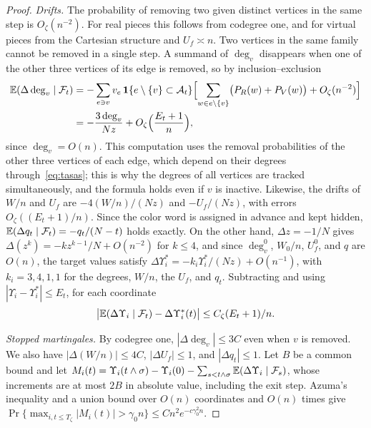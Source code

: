 \begin{proof}
\emph{Drifts.} The probability of removing two given distinct vertices in the same step is
$O_\zeta(n^{-2})$. For real pieces this
follows from codegree one, and for virtual pieces from the Cartesian structure and $U_f\asymp n$. Two
vertices in the same family
cannot be removed in a single step. A summand of $\deg_v$ disappears when one of the other three vertices of
its edge is removed, so
by inclusion--exclusion \[
\begin{aligned}
 \mathbb{E}(\Delta\deg_v\mid\mathcal F_t)&=-\sum_{e\ni v}v_e\,\mathbf{1}\{e\setminus\{v\}\subset\mathcal A_t\}
 \Bigl[\sum_{w\in e\setminus\{v\}}\bigl(P_R(w)+P_V(w)\bigr)+O_\zeta(n^{-2})\Bigr]\\
 &=-\frac{3\deg_v}{Nz}+O_\zeta\Bigl(\frac{E_t+1}n\Bigr),
\end{aligned}
\] since $\deg_v=O(n)$. This computation uses the removal probabilities of the other three vertices of each
edge, which depend on
their degrees through~\eqref{eq:tasas}; this is why the degrees of all vertices are tracked simultaneously,
and the formula holds
even if $v$ is inactive. Likewise, the drifts of $W/n$ and $U_f$ are $-4(W/n)/(Nz)$ and $-U_f/(Nz)$, with
errors
$O_\zeta((E_t+1)/n)$. Since the color word is assigned in advance and kept hidden,
$\mathbb{E}(\Delta q_t\mid\mathcal F_t)=-q_t/(N-t)$
holds exactly. On the other hand, $\Delta z=-1/N$ gives $\Delta(z^k)=-kz^{k-1}/N+O(n^{-2})$ for $k\le4$, and
since $\deg_v^0$,
$W_0/n$, $U_f^0$, and $q$ are $O(n)$, the target values satisfy
$\Delta\Upsilon_i^*=-k_i\Upsilon_i^*/(Nz)+O(n^{-1})$, with
$k_i=3,4,1,1$ for the degrees, $W/n$, the $U_f$, and $q_t$. Subtracting and using
$|\Upsilon_i-\Upsilon_i^*|\le E_t$, for each
coordinate \begin{equation}\label{eq:deriva}
 \bigl|\mathbb{E}(\Delta \Upsilon_i\mid\mathcal F_t)-\Delta \Upsilon_i^*(t)\bigr|\le C_\zeta(E_t+1)/n .
\end{equation}

\emph{Stopped martingales.} By codegree one, $|\Delta\deg_v|\le3C$ even when $v$ is removed. We also have
$|\Delta(W/n)|\le4C$,
$|\Delta U_f|\le1$, and $|\Delta q_t|\le1$. Let $B$ be a common bound and let
$M_i(t)=\Upsilon_i(t\wedge\sigma)-\Upsilon_i(0)-\sum_{s<t\wedge\sigma}\mathbb{E}(\Delta \Upsilon_i\mid\mathcal
F_s)$, whose increments are at
most $2B$ in absolute value, including the exit step. Azuma's inequality and a union bound over $O(n)$
coordinates and $O(n)$ times give $\Pr\{\max_{i,t\le T_\zeta}|M_i(t)|>\gamma_0n\}\le Cn^2e^{-c\gamma_0^2n}$.


\end{proof}
